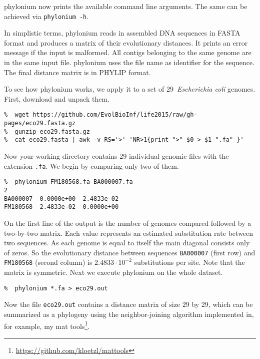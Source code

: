 \documentclass[a4paper,10pt,english]{scrartcl}
\newcommand{\tool}[1]{\textsf{#1}}
\newcommand{\phylonium}{\textsf{phylonium}\xspace}
\begin{document}
\phylonium now prints the available command line arguments. The same can be achieved via \lstinline!phylonium -h!.

In simplistic terms, \phylonium reads in assembled DNA sequences in FASTA format and produces a matrix of their evolutionary distances. It prints an error message if the input is malformed. All contigs belonging to the same genome are in the same input file. \phylonium uses the file name as identifier for the sequence. The final distance matrix is in PHYLIP format.

To see how \phylonium works, we apply it to a set of 29~\textit{Escherichia coli} genomes. First, download and unpack them.

\begin{lstlisting}
%  wget https://github.com/EvolBioInf/life2015/raw/gh-pages/eco29.fasta.gz
%  gunzip eco29.fasta.gz
%  cat eco29.fasta | awk -v RS='>' 'NR>1{print ">" $0 > $1 ".fa" }'
\end{lstlisting}

Now your working directory contains 29 individual genomic files with the extension \lstinline!.fa!. We begin by comparing only two of them.

\begin{lstlisting}
%  phylonium FM180568.fa BA000007.fa
2
BA000007  0.0000e+00  2.4833e-02
FM180568  2.4833e-02  0.0000e+00
\end{lstlisting}

On the first line of the output is the number of genomes compared followed by a two-by-two matrix. Each value represents an estimated substitution rate between two sequences. As each genome is equal to itself the main diagonal consists only of zeros. So the evolutionary distance between sequences \lstinline!BA000007! (first row) and \lstinline!FM180568! (second column) is $2.4833 \cdot{10}^{-2}$ substitutions per site. Note that the matrix is symmetric. Next we execute \phylonium on the whole dataset.

\begin{lstlisting}
%  phylonium *.fa > eco29.out
\end{lstlisting}

Now the file \lstinline!eco29.out! contains a distance matrix of size 29 by 29, which can be summarized as a phylogeny using the neighbor-joining algorithm implemented in, for example, my \tool{mat tools}\footnote{\url{https://github.com/kloetzl/mattools}}.
\end{document}
